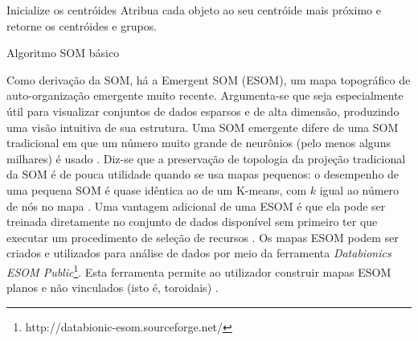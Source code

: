 \begin{algorithm}[!htb]
    \SetAlgoLined
    Inicialize os centróides\;
    Atribua cada objeto ao seu centróide mais próximo e retorne os centróides e grupos.
\caption{Algoritmo SOM básico}
\label{alg:visualizacao}
\end{algorithm}


Como derivação da SOM, há a Emergent SOM (ESOM), um mapa topográfico de auto-organização emergente muito recente. Argumenta-se que seja especialmente útil para visualizar conjuntos de dados esparsos e de alta dimensão, produzindo uma visão intuitiva de sua estrutura. Uma SOM emergente difere de uma SOM tradicional em que um número muito grande de neurônios (pelo menos alguns milhares) é usado \cite{ultsch2005-2}. Diz-se que a preservação de topologia da projeção tradicional da SOM é de pouca utilidade quando se usa mapas pequenos: o desempenho de uma pequena SOM é quase idêntica ao de um K-means, com \textbf{\({k}\)} igual ao número de nós no mapa \cite{ultsch2005}. Uma vantagem adicional de uma ESOM é que ela pode ser treinada diretamente no conjunto de dados disponível sem primeiro ter que executar um procedimento de seleção de recursos \cite{ultsch2003}. Os mapas ESOM podem ser criados e utilizados para análise de dados por meio da ferramenta \textit{Databionics ESOM Public}\footnote{http://databionic-esom.sourceforge.net/ }. Esta ferramenta permite ao utilizador construir mapas ESOM planos e não vinculados (isto é, toroidais) \cite{ultsch2007}.


